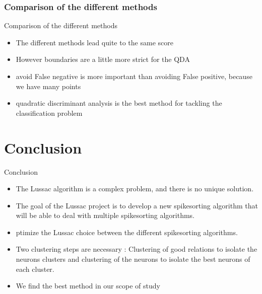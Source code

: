 \documentclass[numbering=fraction]{beamer}
\begin{document}
\subsubsection{Comparison of the different methods}
\begin{frame}{Comparison of the different methods}
    \begin{itemize}
        \item The different methods lead quite to the same score
        \item However boundaries are a little more strict for the QDA
        \item avoid False negative is more important than avoiding False positive, because we have many points
        \item quadratic discriminant analysis is the best method for tackling the classification problem
    \end{itemize}
\end{frame}
\section{Conclusion}
\begin{frame}{Conclusion}
    \begin{itemize}
        \item The Lussac algorithm is a complex problem, and there is no unique solution.
        \item The goal of the Lussac project is to develop a new spikesorting algorithm that will be able to deal with multiple spikesorting algorithms.
        \item ptimize the Lussac choice between the different spikesorting algorithms.
        \item Two clustering steps are necessary : Clustering of good relations to isolate the neurons clusters and clustering of the neurons to isolate the best neurons of each cluster.
        \item We find the best method in our scope of study
    \end{itemize}
\end{frame}
\end{document}
